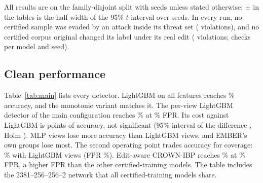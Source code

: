 All results are on the family-disjoint split with \NSeedsFam{} seeds unless stated otherwise; $\pm$ in the tables is the half-width of the 95\% $t$-interval over seeds. In every run, no certified sample was evaded by an attack inside its threat set (\ResNViolations{} violations), and no certified corpus original changed its label under its real edit (\ResCorpusViolations{} violations; \ResCorpusChecked{} checks per model and seed).

\subsection{Clean performance}\label{sec:clean}
Table~\ref{tab:main} lists every detector. LightGBM on all features reaches \FamAccLgbm\% accuracy, and the monotonic variant matches it. The per-view LightGBM detector of the main configuration reaches \FamAccLgbmViews\% at \FamFprLgbmViews\% FPR. Its cost against LightGBM is \CmpFAbs{} points of accuracy, not significant (95\% interval of the difference \CmpFInt, Holm \CmpFPeq). %
MLP views lose more accuracy than LightGBM views, and EMBER's own groups lose most. %
The second operating point trades accuracy for coverage: \ResAccLgbmSecond\% with LightGBM views (FPR \ResFprLgbmSecond\%). Edit-aware CROWN-IBP reaches \SwEditAcc\% at \SwEditFpr\% FPR, a higher FPR than the other certified-training models. %
The table includes the 2381--256--256--2 network that all certified-training models share.

\begin{table}[!htbp]
\centering\small
\caption{Clean test performance (\%), family split, \NSeedsFam{} seeds ($\pm$: half-width of the 95\% interval). The Giri re-implementation was run on \ResNSeedsSmooth{} seeds; its abstentions count as errors.}\label{tab:main}
\resizebox{\textwidth}{!}{}
\end{table}

